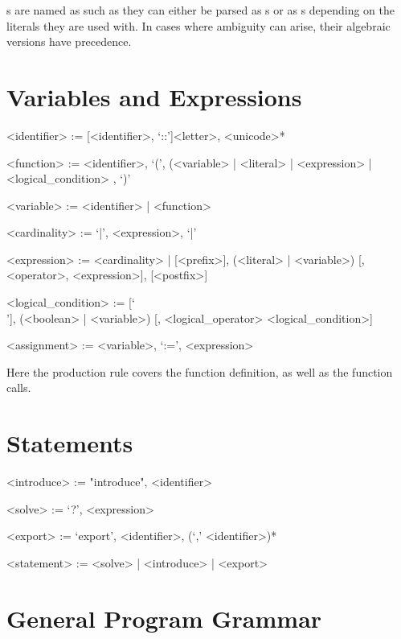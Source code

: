 \documentclass[11pt,a4paper]{book}
\begin{document}
s are named as such as they can either be parsed as s or as s depending on the literals they are used with. In cases where ambiguity can arise, their algebraic versions have precedence.

\section{Variables and Expressions}

\begin{grammar}
<identifier> := [<identifier>, `::']<letter>, <unicode>*

<function> := <identifier>, `(', (<variable> | <literal> | <expression> | <logical\_condition> , `)'

<variable> := <identifier> | <function>

<cardinality> := `|', <expression>, `|'

<expression> := <cardinality> | [<prefix>], (<literal> | <variable>) [, <operator>, <expression>], [<postfix>]

<logical\_condition> := [`\\'], (<boolean> | <variable>) [, <logical\_operator> <logical\_condition>]

<assignment> := <variable>, `:=', <expression>
\end{grammar}

Here the  production rule covers the function definition, as well as the function calls.

\section{Statements}

\begin{grammar}

<introduce> := "introduce", <identifier>

<solve> := `?', <expression>

<export> := `export', <identifier>, (`,' <identifier>)*

<statement> := <solve> | <introduce> | <export>

\end{grammar}

\section{General Program Grammar}
\end{document}
